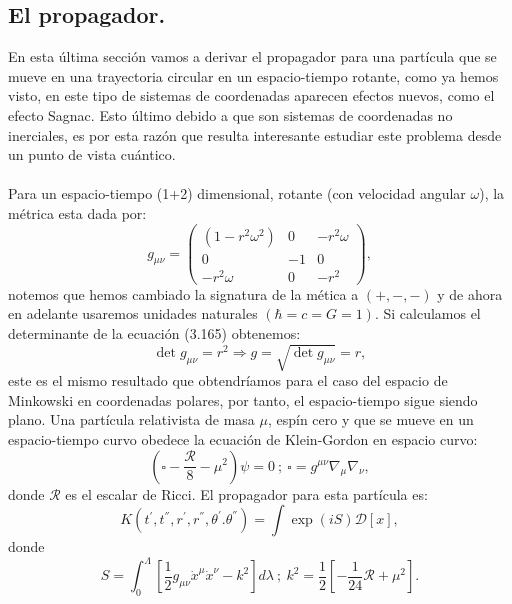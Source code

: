 \subsection{El propagador.}
En esta última sección vamos a derivar el propagador para una partícula que se mueve en una trayectoria circular en un espacio-tiempo rotante, como ya hemos visto, en este tipo de sistemas de coordenadas aparecen efectos nuevos, como el efecto Sagnac. Esto último debido a que son sistemas de coordenadas no inerciales, es por esta razón que resulta interesante estudiar este problema desde un punto de vista cuántico.
\\
\\
Para un espacio-tiempo (1+2) dimensional, rotante (con velocidad angular $\omega$), la métrica esta dada por:
\begin{equation}
g_{\mu\nu}=\left(\begin{array}{ccc}
(1-r^{2}\omega^{2}) & 0 & -r^{2}\omega\\
0 & -1 & 0\\
-r^{2}\omega & 0 & -r^{2}
\end{array}\right),
\end{equation}
notemos que hemos cambiado la signatura de la mética a $(+,-,-)$ y de ahora en adelante usaremos unidades naturales $(\hbar=c=G=1)$. Si calculamos el determinante de la ecuación (3.165) obtenemos:
\begin{equation}
\det g_{\mu\nu}=r^{2}\Rightarrow g=\sqrt{\det g_{\mu\nu}}=r,
\end{equation}
este es el mismo resultado que obtendríamos para el caso del espacio de Minkowski en coordenadas polares, por tanto, el espacio-tiempo sigue siendo plano. Una partícula relativista de masa $\mu$, espín cero y que se mueve en un espacio-tiempo curvo obedece la ecuación de Klein-Gordon en espacio curvo:
\begin{equation}
\left(\square-\frac{\mathcal{R}}{8}-\mu^{2}\right)\psi=0\ ;\ \square=g^{\mu\nu}\nabla_{\mu}\nabla_{\nu},
\end{equation} 
donde $\mathcal{R}$ es el escalar de Ricci. El propagador para esta partícula es:
\begin{equation}
K(t^{'},t^{''},r^{'},r^{''},\theta^{'}.\theta^{''})=\int\exp(iS)\mathcal{D}[x],
\end{equation}
donde
\begin{equation}
S=\int_{0}^{\Lambda}\left[\frac{1}{2}g_{\mu\nu}\dot{x}^{\mu}\dot{x}^{\nu}-k^{2}\right]d\lambda\ ;\ k^{2}=\frac{1}{2}\left[-\frac{1}{24}\mathcal{R}+\mu^{2}\right].	
\end{equation}
